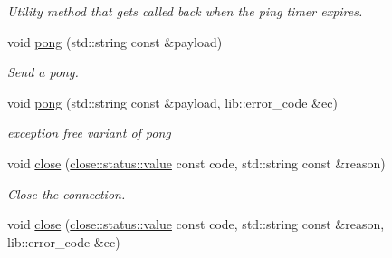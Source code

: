 \begin{DoxyCompactItemize}
\begin{DoxyCompactList}\small\item\em Utility method that gets called back when the ping timer expires. \end{DoxyCompactList}\item 
void \hyperlink{classwebsocketpp_1_1connection_aa8684fcfd9a57466ae1b52e36b834408}{pong} (std\+::string const \&payload)
\begin{DoxyCompactList}\small\item\em Send a pong. \end{DoxyCompactList}\item 
void \hyperlink{classwebsocketpp_1_1connection_a837dcb8f1214f08b92e7ae7489bfa180}{pong} (std\+::string const \&payload, lib\+::error\+\_\+code \&ec)\hypertarget{classwebsocketpp_1_1connection_a837dcb8f1214f08b92e7ae7489bfa180}{}\label{classwebsocketpp_1_1connection_a837dcb8f1214f08b92e7ae7489bfa180}

\begin{DoxyCompactList}\small\item\em exception free variant of pong \end{DoxyCompactList}\item 
void \hyperlink{classwebsocketpp_1_1connection_ae718e4fa8b2c37757d8abd71dae07dc9}{close} (\hyperlink{namespacewebsocketpp_1_1close_1_1status_a8614a5c4733d708e2d2a32191c5bef84}{close\+::status\+::value} const code, std\+::string const \&reason)
\begin{DoxyCompactList}\small\item\em Close the connection. \end{DoxyCompactList}\item 
void \hyperlink{classwebsocketpp_1_1connection_a436058fe88b1ba31080cec2a464634ae}{close} (\hyperlink{namespacewebsocketpp_1_1close_1_1status_a8614a5c4733d708e2d2a32191c5bef84}{close\+::status\+::value} const code, std\+::string const \&reason, lib\+::error\+\_\+code \&ec)\hypertarget{classwebsocketpp_1_1connection_a436058fe88b1ba31080cec2a464634ae}{}\label{classwebsocketpp_1_1connection_a436058fe88b1ba31080cec2a464634ae}


\end{DoxyCompactItemize}
